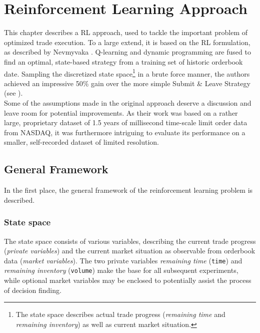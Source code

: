 \chapter{Reinforcement Learning Approach}
\label{chap:reinforcementlearning}
This chapter describes a \ac{RL} approach, used to tackle the important problem of optimized trade execution. To a large extend, it is based on the \ac{RL} formulation, as described by Nevmyvaka \etal \cite{Nevmyvaka:2006}. Q-learning and dynamic programming are fused to find an optimal, state-based strategy from a training set of historic orderbook date. Sampling the discretized state space\footnote{The state space describes actual trade progress (\ie \emph{remaining time} and \emph{remaining inventory}) as well as current market situation.} in a brute force manner, the authors achieved an impressive 50\% gain over the more simple Submit \& Leave Strategy (see ).\\

Some of the assumptions made in the original approach deserve a discussion and leave room for potential improvements. As their work was based on a rather large, proprietary dataset of 1.5 years of millisecond time-scale limit order data from \acs{NASDAQ}, it was furthermore intriguing to evaluate its performance on a smaller, self-recorded dataset of limited resolution.


\section{General Framework}
\label{chap:reinforcementlearning:original}
In the first place, the general framework of the reinforcement learning problem is described.


\subsection{State space}
\label{chap:statespace}
The state space consists of various variables, describing the current trade progress (\emph{private variables}) and the current market situation as observable from orderbook data (\emph{market variables}). The two private variables \emph{remaining time} (\lstinline!time!) and \emph{remaining inventory} (\lstinline!volume!) make the base for all subsequent experiments, while optional market variables may be enclosed to potentially assist the process of decision finding.\\

